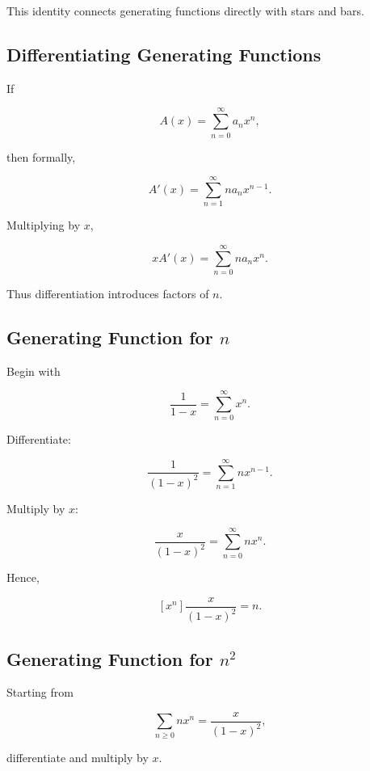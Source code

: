 This identity connects generating functions directly with stars and
bars.

\subsection{Differentiating Generating Functions}
\label{subsec:differentiating-generating-functions}

If

\[
A(x)
=
\sum_{n=0}^{\infty}a_nx^n,
\]

then formally,

\[
A'(x)
=
\sum_{n=1}^{\infty}na_nx^{n-1}.
\]

Multiplying by \(x\),

\[
\boxed{
xA'(x)
=
\sum_{n=0}^{\infty}na_nx^n.
}
\]

Thus differentiation introduces factors of \(n\).

\subsection{Generating Function for \(n\)}
\label{subsec:gf-for-n}

Begin with

\[
\frac{1}{1-x}
=
\sum_{n=0}^{\infty}x^n.
\]

Differentiate:

\[
\frac{1}{(1-x)^2}
=
\sum_{n=1}^{\infty}nx^{n-1}.
\]

Multiply by \(x\):

\[
\boxed{
\frac{x}{(1-x)^2}
=
\sum_{n=0}^{\infty}nx^n.
}
\]

Hence,

\[
\boxed{
[x^n]\frac{x}{(1-x)^2}=n.
}
\]

\subsection{Generating Function for \(n^2\)}
\label{subsec:gf-for-n-squared}

Starting from

\[
\sum_{n\geq0}nx^n
=
\frac{x}{(1-x)^2},
\]

differentiate and multiply by \(x\).


